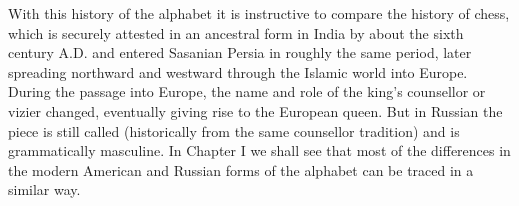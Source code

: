 With this history of the alphabet it is instructive to compare the history of chess, which is securely attested in an ancestral form in India by about the sixth century A.D. and entered Sasanian Persia in roughly the same period, later spreading northward and westward through the Islamic world into Europe. During the passage into Europe, the name and role of the king's counsellor or vizier changed, eventually giving rise to the European queen. But in Russian the piece is still called  (historically from the same counsellor tradition) and is grammatically masculine. In Chapter I we shall see that most of the differences in the modern American and Russian forms of the alphabet can be traced in a similar way.
